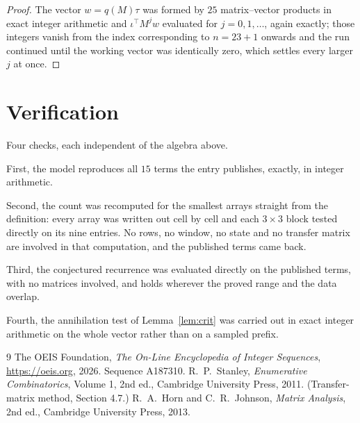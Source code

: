 \documentclass[11pt,a4paper]{article}
\theoremstyle{plain}
\theoremstyle{definition}
\begin{document}
\begin{proof}
The vector $w=q(M)\tau$ was formed by $25$ matrix--vector products in exact integer
arithmetic and $\iota^{\!\top}M^{j}w$ evaluated for $j=0,1,\dots$, again exactly; those
integers vanish from the index corresponding to $n=23+1$ onwards and the run continued
until the working vector was identically zero, which settles every larger $j$ at once.
\end{proof}

\section{Verification}

Four checks, each independent of the algebra above.

First, the model reproduces all $15$ terms the entry publishes, exactly, in integer
arithmetic.

Second, the count was recomputed for the smallest arrays straight from the definition: every
array was written out cell by cell and each $3\times3$ block tested directly on its nine
entries. No rows, no window, no state and no transfer matrix are involved in that computation,
and the published terms came back.

Third, the conjectured recurrence was evaluated directly on the published terms, with no
matrices involved, and holds wherever the proved range and the data overlap.

Fourth, the annihilation test of Lemma~\ref{lem:crit} was carried out in exact integer
arithmetic on the whole vector rather than on a sampled prefix.

\begin{thebibliography}{9}
 The OEIS Foundation, \emph{The On-Line Encyclopedia of Integer
Sequences}, \url{https://oeis.org}, 2026. Sequence A187310.
 R.~P.~Stanley, \emph{Enumerative Combinatorics}, Volume 1, 2nd ed.,
Cambridge University Press, 2011. (Transfer-matrix method, Section 4.7.)
 R.~A.~Horn and C.~R.~Johnson, \emph{Matrix Analysis}, 2nd ed., Cambridge
University Press, 2013.
\end{thebibliography}
\end{document}
